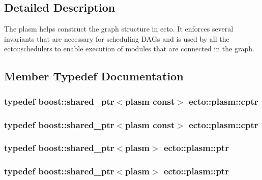 \subsection{Detailed Description}
The plasm helps construct the graph structure in ecto. It enforces several invariants that are necessary for scheduling D\-A\-Gs and is used by all the ecto\-::schedulers to enable execution of modules that are connected in the graph. 

\subsection{Member Typedef Documentation}
\hypertarget{structecto_1_1plasm_afd3b9e2d4732023ab9e94553e0d66ac4}{
\subsubsection[{cptr}]{\setlength{\rightskip}{0pt plus 5cm}typedef boost\-::shared\-\_\-ptr$<${\bf plasm} const$>$ {\bf ecto\-::plasm\-::cptr}}}\label{structecto_1_1plasm_afd3b9e2d4732023ab9e94553e0d66ac4}
\hypertarget{structecto_1_1plasm_afd3b9e2d4732023ab9e94553e0d66ac4}{
\subsubsection[{cptr}]{\setlength{\rightskip}{0pt plus 5cm}typedef boost\-::shared\-\_\-ptr$<${\bf plasm} const$>$ {\bf ecto\-::plasm\-::cptr}}}\label{structecto_1_1plasm_afd3b9e2d4732023ab9e94553e0d66ac4}
\hypertarget{structecto_1_1plasm_a899b9da452ab35849f07038c90990ac3}{
\subsubsection[{ptr}]{\setlength{\rightskip}{0pt plus 5cm}typedef boost\-::shared\-\_\-ptr$<${\bf plasm}$>$ {\bf ecto\-::plasm\-::ptr}}}\label{structecto_1_1plasm_a899b9da452ab35849f07038c90990ac3}
\hypertarget{structecto_1_1plasm_a899b9da452ab35849f07038c90990ac3}{
\subsubsection[{ptr}]{\setlength{\rightskip}{0pt plus 5cm}typedef boost\-::shared\-\_\-ptr$<${\bf plasm}$>$ {\bf ecto\-::plasm\-::ptr}}}\label{structecto_1_1plasm_a899b9da452ab35849f07038c90990ac3}


